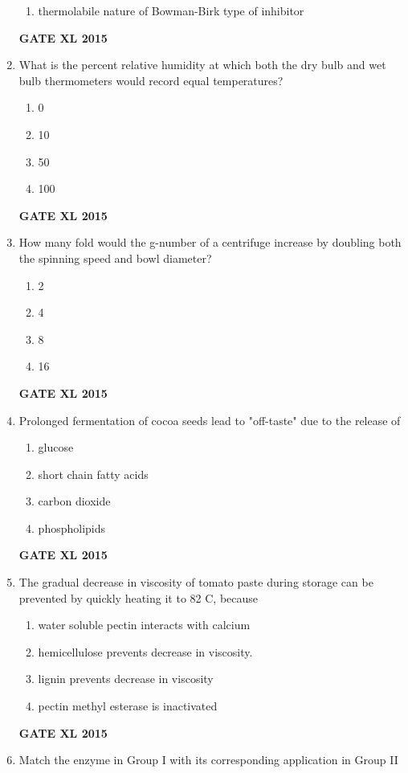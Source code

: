 \documentclass[journal,12pt,onecolumn]{IEEEtran}
\begin{document}
\begin{enumerate}
\begin{enumerate}
            \item thermolabile nature of Bowman-Birk type of inhibitor
    \end{enumerate}
\hfill{\textbf{GATE XL 2015}}
\item What is the percent relative humidity at which both the dry bulb and wet bulb thermometers would record equal temperatures?
    \begin{enumerate}
            \item 0
	    \item 10
	    \item 50
            \item 100
    \end{enumerate}
\hfill{\textbf{GATE XL 2015}}
\item How many fold would the g-number of a centrifuge increase by doubling both the spinning speed and bowl diameter?
    \begin{enumerate}
            \item 2
	    \item 4
	    \item 8
            \item 16
    \end{enumerate}
\hfill{\textbf{GATE XL 2015}}
\item Prolonged fermentation of cocoa seeds lead to "off-taste" due to the release of
    \begin{enumerate}
            \item glucose
	    \item short chain fatty acids 
	    \item  carbon dioxide
            \item phospholipids
    \end{enumerate}
\hfill{\textbf{GATE XL 2015}}
\item The gradual decrease in viscosity of tomato paste during storage can be prevented by quickly heating it to 82 \degree C, because
    \begin{enumerate}
            \item water soluble pectin interacts with calcium
	    \item hemicellulose prevents decrease in viscosity.
	    \item lignin prevents decrease in viscosity
            \item pectin methyl esterase is inactivated
    \end{enumerate}
\hfill{\textbf{GATE XL 2015}}
\item {Match the enzyme in Group I with its corresponding application in Group II}


\end{enumerate}
\end{document}
